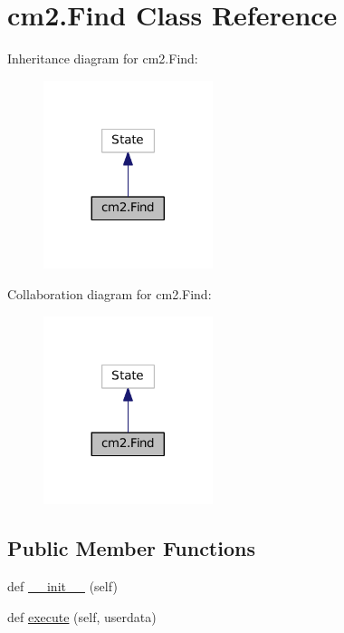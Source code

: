 \hypertarget{classcm2_1_1Find}{}\section{cm2.\+Find Class Reference}
\label{classcm2_1_1Find}


Inheritance diagram for cm2.\+Find\+:\nopagebreak
\begin{figure}[H]
\begin{center}
\leavevmode
\includegraphics[width=140pt]{classcm2_1_1Find__inherit__graph}
\end{center}
\end{figure}


Collaboration diagram for cm2.\+Find\+:\nopagebreak
\begin{figure}[H]
\begin{center}
\leavevmode
\includegraphics[width=140pt]{classcm2_1_1Find__coll__graph}
\end{center}
\end{figure}
\subsection*{Public Member Functions}
\begin{DoxyCompactItemize}
\item 
def \hyperlink{classcm2_1_1Find_a1a20e9454200ef616ad65427d31c1466}{\+\_\+\+\_\+init\+\_\+\+\_\+} (self)
\item 
def \hyperlink{classcm2_1_1Find_a6affa2cb10770492d7f33dee2ae02f44}{execute} (self, userdata)
\end{DoxyCompactItemize}
